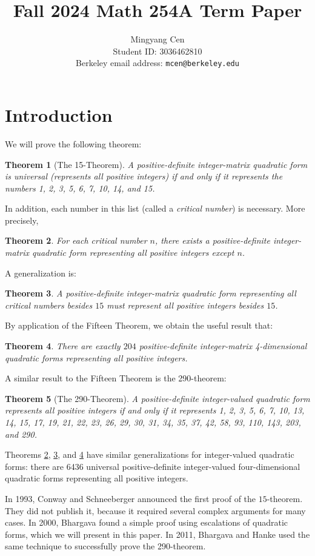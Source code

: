 \documentclass{article}
\title{Fall 2024 Math 254A Term Paper}
\author{Mingyang Cen \\ Student ID: 3036462810 \\ Berkeley email address: \texttt{mcen@berkeley.edu}}
\newtheorem{thm}{Theorem}
\begin{document}
\maketitle

\section{Introduction}
We will prove the following theorem:
\begin{thm}[The 15-Theorem]\label{15thm}
    A positive-definite integer-matrix quadratic form is universal (represents all positive integers) if and only if it represents the numbers 1, 2, 3, 5, 6, 7, 10, 14, and 15.
\end{thm}
In addition, each number in this list (called a \emph{critical number}) is necessary. More precisely,
\begin{thm}\label{critnumsneeded}
    For each critical number $n$, there exists a positive-definite integer-matrix quadratic form representing all positive integers except $n$.
\end{thm}
A generalization is:
\begin{thm}\label{15thmgeneral}
    A positive-definite integer-matrix quadratic form representing all critical numbers besides $15$ must represent all positive integers besides $15$.
\end{thm}
By application of the Fifteen Theorem, we obtain the useful result that:
\begin{thm}\label{universal 4d}
    There are exactly $204$ positive-definite integer-matrix 4-dimensional quadratic forms representing all positive integers.
\end{thm}
A similar result to the Fifteen Theorem is the 290-theorem:
\begin{thm}[The 290-Theorem]
    A positive-definite integer-valued quadratic form represents all positive integers if and only if it represents 1, 2, 3, 5, 6, 7, 10, 13, 14, 15, 17, 19, 21, 22, 23, 26, 29, 30, 31, 34, 35, 37, 42, 58, 93, 110, 143, 203, and 290.
\end{thm}
Theorems \ref{critnumsneeded}, \ref{15thmgeneral}, and \ref{universal 4d} have similar generalizations for integer-valued quadratic forms: there are 6436 universal positive-definite integer-valued four-dimensional quadratic forms representing all positive integers.

In 1993, Conway and Schneeberger announced the first proof of the $15$-theorem. They did not publish it, because it required several complex arguments for many cases. In 2000, Bhargava \cite{fifteen} found a simple proof using escalations of quadratic forms, which we will present in this paper. In 2011, Bhargava and Hanke \cite{twoninety} used the same technique to successfully prove the 290-theorem.
\end{document}
